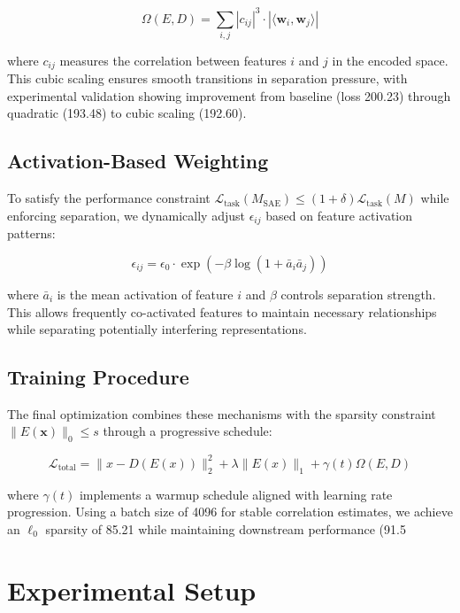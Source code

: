 \documentclass{article} %
\begin{document}
\begin{equation}
    \Omega(E,D) = \sum_{i,j} |c_{ij}|^3 \cdot |\langle \mathbf{w}_i, \mathbf{w}_j \rangle|
\end{equation}

where $c_{ij}$ measures the correlation between features $i$ and $j$ in the encoded space. This cubic scaling ensures smooth transitions in separation pressure, with experimental validation showing improvement from baseline (loss 200.23) through quadratic (193.48) to cubic scaling (192.60).

\subsection{Activation-Based Weighting}
To satisfy the performance constraint $\mathcal{L}_{\text{task}}(M_{\text{SAE}}) \leq (1+\delta)\mathcal{L}_{\text{task}}(M)$ while enforcing separation, we dynamically adjust $\epsilon_{ij}$ based on feature activation patterns:

\begin{equation}
    \epsilon_{ij} = \epsilon_0 \cdot \exp(-\beta \log(1 + \bar{a}_i \bar{a}_j))
\end{equation}

where $\bar{a}_i$ is the mean activation of feature $i$ and $\beta$ controls separation strength. This allows frequently co-activated features to maintain necessary relationships while separating potentially interfering representations.

\subsection{Training Procedure}
The final optimization combines these mechanisms with the sparsity constraint $\|E(\mathbf{x})\|_0 \leq s$ through a progressive schedule:

\begin{equation}
    \mathcal{L}_{\text{total}} = \|x - D(E(x))\|_2^2 + \lambda\|E(x)\|_1 + \gamma(t)\Omega(E,D)
\end{equation}

where $\gamma(t)$ implements a warmup schedule aligned with learning rate progression. Using a batch size of 4096 for stable correlation estimates, we achieve an $\ell_0$ sparsity of 85.21 while maintaining downstream performance (91.5%

\section{Experimental Setup}
\label{sec:experimental}
\end{document}
